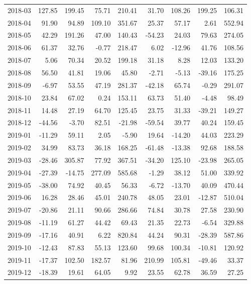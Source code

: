 \begin{table}[ht]
\begin{tabular}{lrrrrrrrr}
  2018-03 & 127.85 & 199.45 & 75.71 & 210.41 & 31.70 & 108.26 & 199.25 & 106.31 \\ 
  2018-04 & 91.90 & 94.89 & 109.10 & 351.67 & 25.37 & 57.17 & 2.61 & 552.94 \\ 
  2018-05 & 42.29 & 191.26 & 47.00 & 140.43 & -54.23 & 24.03 & 79.63 & 274.05 \\ 
  2018-06 & 61.37 & 32.76 & -0.77 & 218.47 & 6.02 & -12.96 & 41.76 & 108.56 \\ 
  2018-07 & 5.06 & 70.34 & 20.52 & 199.18 & 31.18 & 8.28 & 12.03 & 133.20 \\ 
  2018-08 & 56.50 & 41.81 & 19.06 & 45.80 & -2.71 & -5.13 & -39.16 & 175.25 \\ 
  2018-09 & -6.97 & 53.55 & 47.19 & 281.37 & -42.18 & 65.74 & -0.29 & 291.07 \\ 
  2018-10 & 23.84 & 67.02 & 0.24 & 153.11 & 63.73 & 51.40 & -4.48 & 98.49 \\ 
  2018-11 & 14.48 & 27.19 & 64.70 & 125.45 & 23.75 & 31.33 & -39.21 & 149.27 \\ 
  2018-12 & -44.56 & -3.70 & 82.51 & -21.98 & -59.54 & 39.77 & 40.24 & 159.45 \\ 
  2019-01 & -11.29 & 59.11 & 2.05 & -5.90 & 19.64 & -14.20 & 44.03 & 223.29 \\ 
  2019-02 & 34.99 & 83.73 & 36.18 & 168.25 & -61.48 & -13.38 & 92.68 & 188.58 \\ 
  2019-03 & -28.46 & 305.87 & 77.92 & 367.51 & -34.20 & 125.10 & -23.98 & 265.05 \\ 
  2019-04 & -27.39 & -14.75 & 277.09 & 585.68 & -1.29 & 38.12 & 51.00 & 339.92 \\ 
  2019-05 & -38.00 & 74.92 & 40.45 & 56.33 & -6.72 & -13.70 & 40.09 & 470.44 \\ 
  2019-06 & 16.28 & 28.46 & 45.01 & 240.78 & 48.05 & 23.01 & -12.87 & 510.04 \\ 
  2019-07 & -20.86 & 21.11 & 90.66 & 286.66 & 74.84 & 30.78 & 27.58 & 230.90 \\ 
  2019-08 & -11.19 & 61.27 & 44.42 & 69.43 & 21.35 & 22.73 & -6.54 & 329.88 \\ 
  2019-09 & -17.16 & 40.91 & 6.22 & 820.84 & 44.24 & 90.31 & -28.39 & 587.86 \\ 
  2019-10 & -12.43 & 87.83 & 55.13 & 123.60 & 99.68 & 100.34 & -10.81 & 120.92 \\ 
  2019-11 & -17.37 & 102.50 & 182.57 & 81.96 & 210.99 & 105.81 & -49.46 & 33.37 \\ 
  2019-12 & -18.39 & 19.61 & 64.05 & 9.92 & 23.55 & 62.78 & 36.59 & 27.25 \\ 

\end{tabular}
\end{table}

